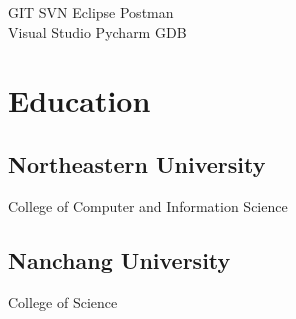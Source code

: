 \documentclass[a4paper]{lyu-resume} %
\begin{document}
\begin{minipage}[t]{0.33\textwidth}
\vspace{2 mm}

GIT \textbullet{} SVN \textbullet{} Eclipse \textbullet{} Postman \\
Visual Studio \textbullet{} Pycharm \textbullet{} GDB \\
\sectionspace %







\section{Education} 

\subsection{Northeastern University}

College of Computer and Information Science

\sectionspace %


\subsection{Nanchang University}

College of Science

\sectionspace %


\end{minipage}
\end{document}
